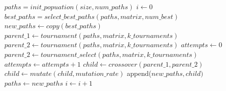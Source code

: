 \documentclass{scrartcl}
\begin{document}


\begin{algorithm}[H]
\caption{Genetic Algorithm}\label{alg:complete}
\begin{algorithmic}
\State $paths = init\_popuation(size, num\_paths)$
\newline
\State $i \gets 0$
\newline
\State $best\_paths = select\_best\_paths(paths, matrix, num\_best)$
\State $new\_paths \gets copy(best\_paths)$
\newline
{}
\newline
\State $parent\_1 \gets tournament(paths, matrix, k\_tournaments)$
\State $parent\_2 \gets tournament(paths, matrix, k\_tournaments)$
\newline
\State $attempts \gets 0$
\newline
\State $parent\_2 \gets tournament\_select(paths, matrix, k\_tournaments)$
\State $attempts \gets attempts + 1$
\newline
\EndWhile
\newline
\State $child \gets crossover(parent\_1, parent\_2)$
\State $child \gets mutate(child, mutation\_rate)$
\State append($new\_paths, child)$
\newline
\EndWhile
\newline
\State $paths \gets new\_paths$
\State $i \gets i + 1$
\newline
\EndWhile
\end{algorithmic}
\end{algorithm}
\end{document}
